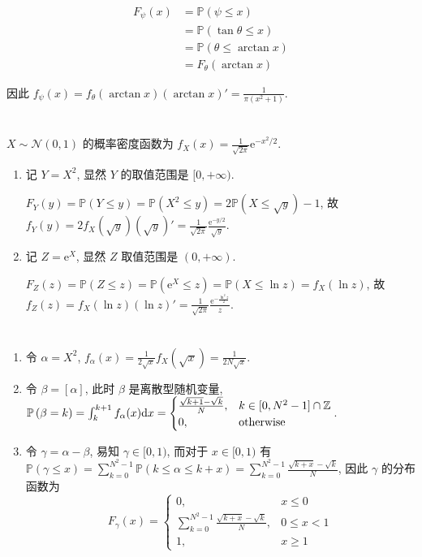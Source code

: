 \documentclass[8pt]{article}
\theoremstyle{compact}
\def\le{\leqslant}
\def\ge{\geqslant}
\def\P#1{\mathbb{P}\left({#1}\right)}
\def\e{\mathrm{e}}
\begin{document}
\begin{equation}
	\begin{split}
		F_{\psi}(x) &= \P{\psi \le x} \\
		&= \P{\tan \theta \le x}\\
		&= \P{\theta \le \arctan x}\\
		&= F_{\theta}(\arctan x)
	\end{split}
\end{equation}

因此 $f_{\psi}(x) = f_{\theta}(\arctan x) \left(\arctan x\right)' = \frac{1}{\pi(x^2+1)}$.

\section{}

$X \sim \mathcal N(0, 1)$ 的概率密度函数为 $f_X(x) = \frac{1}{\sqrt{2\pi}}\e^{-x^2/2}$.

\begin{enumerate}
	\item 记 $Y = X^2$, 显然 $Y$ 的取值范围是 $[0, +\infty)$.
	
	$F_Y(y) = \P{Y \le y} = \P{X^2 \le y} = 2\P{X \le \sqrt{y}} - 1$, 故 $f_Y(y) = 2f_X(\sqrt{y})(\sqrt{y})' = \frac{1}{\sqrt{2\pi}}\frac{\e^{-y/2}}{\sqrt y}$.

	\item 记 $Z = \e^X$, 显然 $Z$ 取值范围是 $(0, +\infty)$.
	
	$F_Z(z) = \P{Z \le z} = \P{\e^X \le z} = \P{X \le \ln z} = f_X(\ln z)$, 故 $f_Z(z) = f_X(\ln z)(\ln z)' = \frac{1}{\sqrt{2\pi}}\frac{\e^{-\frac{\ln^2 z}{2}}}{z}$.
\end{enumerate}

\section{}
\begin{enumerate}
	\item 令 $\alpha = X^2$, $f_{\alpha}(x) = \frac{1}{2\sqrt x}f_X(\sqrt{x}) = \frac{1}{2N\sqrt x}$.
	\item 令 $\beta = [\alpha]$, 此时 $\beta$ 是离散型随机变量, $\P{\beta = k} = \int_{k}^{k+1}f_{\alpha}(x)\text dx = \begin{cases}
		\frac{\sqrt{k+1} - \sqrt k}{N}, & k \in [0, N^2 - 1] \cap \mathbb Z\\
		0, & \textrm{otherwise}
	\end{cases}$.
	\item 令 $\gamma = \alpha - \beta$, 易知 $\gamma \in [0, 1)$, 而对于 $x \in [0, 1)$ 有 $\P{\gamma \le x} = \sum\limits_{k = 0}^{N^2-1} \P{k \le \alpha \le k + x} = \sum\limits_{k=0}^{N^2-1}\frac{\sqrt{k + x} - \sqrt k}{N}$, 因此 $\gamma$ 的分布函数为\begin{equation} F_{\gamma}(x) = \begin{cases}
		0, & x \le 0\\
		\sum\limits_{k=0}^{N^2-1} \frac{\sqrt{k+x} - \sqrt k}{N}, & 0 \le x < 1\\
		1, & x \ge 1
	\end{cases}\end{equation}
\end{enumerate}
\end{document}
